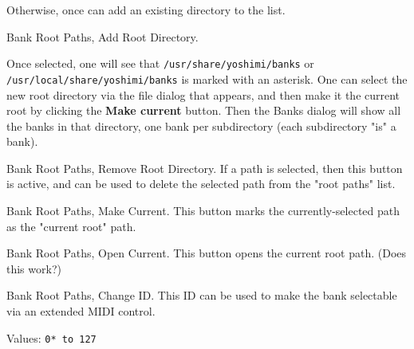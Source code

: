    Otherwise, once can add an existing directory to the list.

   \setcounter{ItemCounter}{0}      %

   Bank Root Paths, Add Root Directory.

   Once selected, one will see that
   \texttt{/usr/share/yoshimi/banks} or
   \texttt{/usr/local/share/yoshimi/banks}
   is marked with an asterisk.  One can select the new root directory via the
   file dialog that appears, and then make it the current root by clicking the
   \textbf{Make current} button.  Then the Banks dialog will show all the banks
   in that directory, one bank per subdirectory (each subdirectory "is" a
   bank).

   Bank Root Paths, Remove Root Directory.
   If a path is selected, then this button is active, and can be used to
   delete the selected path from the "root paths" list.

   Bank Root Paths, Make Current.
   This button marks the currently-selected path as the "current root" path.

   Bank Root Paths, Open Current.
   This button opens the current root path.
   (Does this work?)

   Bank Root Paths, Change ID.
   This ID can be used to make the bank selectable via an extended MIDI
   control.

   Values: \texttt{0* to 127}


